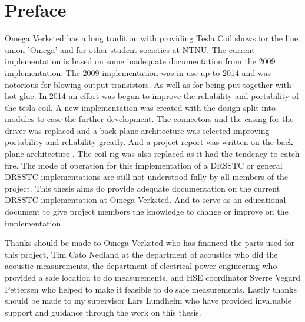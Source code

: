 \newpage
\section*{Preface}

Omega Verksted has a long tradition with providing Tesla Coil shows for the line union 'Omega' and for other student societies at NTNU. The current implementation is based on some inadequate documentation from the 2009 implementation. The 2009 implementation was in use up to 2014 and was notorious for blowing output transistors. As well as for being put together with hot glue. In 2014 an effort was begun to improve the reliability and portability of the tesla coil. A new implementation was created with the design split into modules to ease the further development. The connectors and the casing for the driver was replaced and a back plane architecture was selected improving portability and reliability greatly. And a project report was written on the back plane architecture \citep{prosjektoppgave}. The coil rig was also replaced as it had the tendency to catch fire. The mode of operation for this implementation of a DRSSTC or general DRSSTC implementations are still not understood fully by all members of the project. This thesis aims do provide adequate documentation on the current DRSSTC implementation at Omega Verksted. And to serve as an educational document to give project members the knowledge to change or improve on the implementation.

Thanks should be made to Omega Verksted who has financed the parts used for this project, Tim Cato Nedland at the department of acoustics who did the acoustic measurements, the department of electrical power engineering who provided a safe location to do measurements, and HSE coordinator Sverre Vegard Pettersen who helped to make it feasible to do safe measurements. Lastly thanks should be made to my supervisor Lars Lundheim who have provided invaluable support and guidance through the work on this thesis.